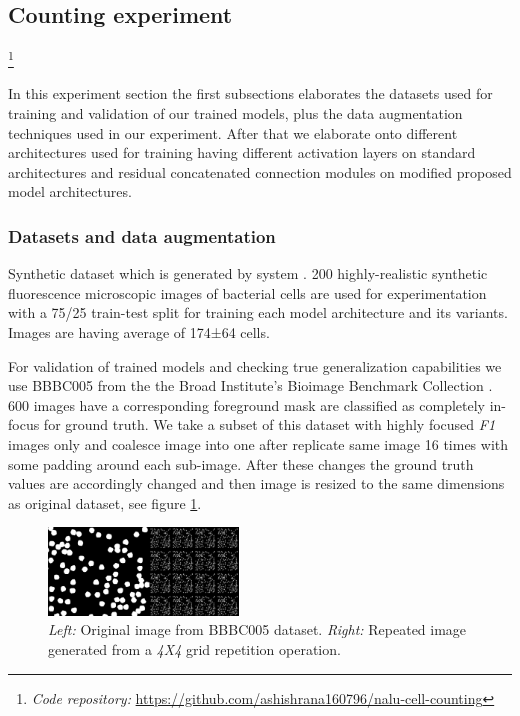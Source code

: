 \documentclass[conference]{IEEEtran}
\begin{document}
\subsection{Counting experiment}

\footnote{\textit{Code repository:} \url{https://github.com/ashishrana160796/nalu-cell-counting}}

In this experiment section the first subsections elaborates the datasets used for training and validation of our trained models, plus the data augmentation techniques used in our experiment. After that we elaborate onto different architectures used for training having different activation layers on standard architectures and residual concatenated connection modules on modified proposed model architectures.

\subsubsection{Datasets and data augmentation}

Synthetic dataset which is generated by system \cite{b28}. 200 highly-realistic synthetic fluorescence microscopic images of bacterial cells are used for experimentation with a 75/25 train-test split for training each model architecture and its variants. Images are having average of 174±64 cells.

For validation of trained models and checking true generalization capabilities we use BBBC005 from the the Broad Institute’s Bioimage Benchmark Collection \cite{b29}. 600 images have a corresponding foreground mask are classified as completely in-focus for ground truth. We take a subset of this dataset with highly focused \textit{F1} images only and coalesce image into one after replicate same image 16 times with some padding around each sub-image. After these changes the ground truth values are accordingly changed and then image is resized to the same dimensions as original dataset, see figure \ref{fig6}.

\begin{figure}[!h]
\centering
\includegraphics[width=0.45\textwidth]{assets/bbbc005-custom-dataset.png}
\caption{\textit{Left: }Original image from BBBC005 dataset. \textit{Right: }Repeated image generated from a \textit{4X4} grid repetition operation.}
\label{fig6}
\end{figure}
\end{document}
